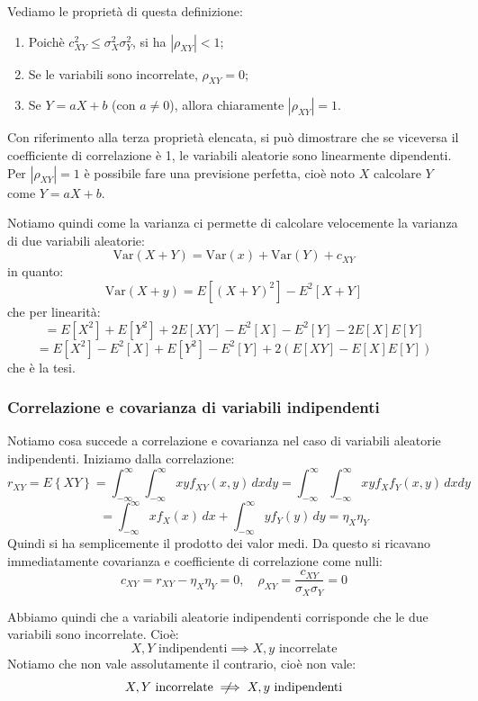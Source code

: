 \documentclass[a4paper,11pt]{article}
\begin{document}
Vediamo le proprietà di questa definizione:
\begin{enumerate}
	\item Poichè $c_{XY}^2 \leq \sigma_X^2 \sigma_Y^2$, si ha $|\rho_{XY}| < 1$;
	\item Se le variabili sono incorrelate, $\rho_{XY} = 0$;
	\item Se $Y = aX + b$ (con $a \neq 0$), allora chiaramente $|\rho_{XY}| = 1$.
\end{enumerate}
Con riferimento alla terza proprietà elencata, si può dimostrare che se viceversa il coefficiente di correlazione è 1, le variabili aleatorie sono linearmente dipendenti. Per $|\rho_{XY}| = 1$ è possibile fare una previsione perfetta, cioè noto $X$ calcolare $Y$ come $Y = aX + b$.

\par\smallskip

Notiamo quindi come la varianza ci permette di calcolare velocemente la varianza di due variabili aleatorie:
$$
\mathrm{Var}(X + Y) = \mathrm{Var}(x) + \mathrm{Var}(Y) + c_{XY}
$$
in quanto:
$$
\mathrm{Var}(X + y) = E\left[(X + Y)^2\right] - E^2 \left[ X + Y \right]
$$
che per linearità:
$$
= E\left[X^2\right] + E\left[Y^2\right] + 2 E\left[XY\right] - E^2\left[X\right] - E^2\left[Y\right] - 2E\left[X\right]E\left[Y\right]
$$
$$
= E\left[X^2\right] - E^2\left[X\right] + E\left[Y^2\right] - E^2\left[Y\right] + 2 \left( E \left[ XY \right] - E\left[X\right] E\left[Y\right] \right)
$$
che è la tesi.

\subsubsection{Correlazione e covarianza di variabili indipendenti}
Notiamo cosa succede a correlazione e covarianza nel caso di variabili aleatorie indipendenti. Iniziamo dalla correlazione:
$$
r_{XY} = E \left\{XY\right\}
= \int_{-\infty}^{\infty} \int_{-\infty}^{\infty} x y f_{XY} (x, y) \, dx dy 
= \int_{-\infty}^{\infty} \int_{-\infty}^{\infty} x y f_{X} f_{Y} (x, y) \, dx dy
$$
$$
= \int_{-\infty}^{\infty} x f_X(x) \, dx + \int_{-\infty}^{\infty} y f_Y(y) \, dy = \eta_X \eta_Y
$$
Quindi si ha semplicemente il prodotto dei valor medi. Da questo si ricavano immediatamente covarianza e coefficiente di correlazione come nulli:
$$
c_{XY} = r_{XY} - \eta_X \eta_Y = 0 , \quad \rho_{XY} = \frac{c_{XY}}{\sigma_X \sigma_Y} = 0
$$

Abbiamo quindi che a variabili aleatorie indipendenti corrisponde che le due variabili sono incorrelate. Cioè:
$$
X, Y \text{ indipendenti} \implies X, y \text{ incorrelate}
$$
Notiamo che non vale assolutamente il contrario, cioè non vale:
$$
X, Y \text{ incorrelate} \mathrel{{\ooalign{\hidewidth$\not\phantom{=}$\hidewidth\cr$\implies$}}} X, y \text{ indipendenti}
$$
\end{document}
